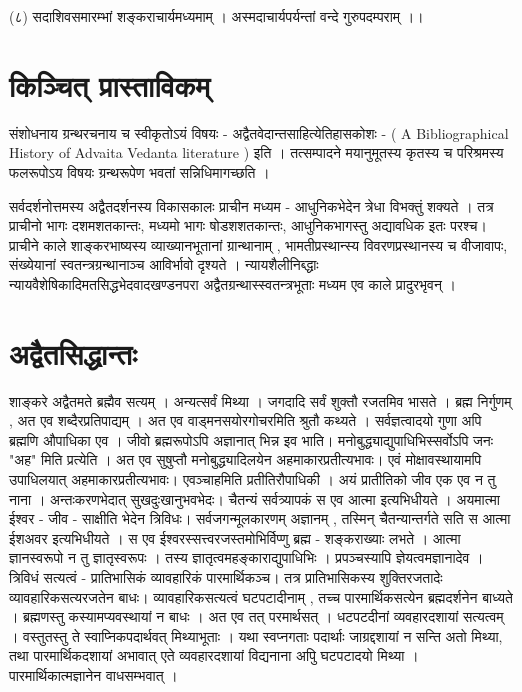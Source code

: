 (८) सदाशिवसमारम्भां शङ्कराचार्यमध्यमाम् ।
अस्मदाचार्यपर्यन्तां वन्दे गुरुपदम्पराम् ।।


\section{किञ्चित् प्रास्ताविकम् }
संशोधनाय ग्रन्थरचनाय च स्वीकृतोऽयं विषयः - अद्वैतवेदान्तसाहित्येतिहासकोशः - ( A Bibliographical History of Advaita Vedanta literature ) इति । तत्सम्पादने मयानुमूतस्य कृतस्य च परिश्रमस्य फलरूपोऽय विषयः ग्रन्थरूपेण भवतां सन्निधिमागच्छति । 

सर्वदर्शनोत्तमस्य अद्वैतदर्शनस्य विकासकालः प्राचीन मध्यम - आधुनिकभेदेन त्रेधा विभक्तुं शक्यते । तत्र प्राचीनो भागः दशमशतकान्तः, मध्यमो भागः षोडशशतकान्तः, आधुनिकभागस्तु अद्यावधिक इतः परश्च। प्राचीने काले शाङ्करभाष्यस्य व्याख्यानभूतानां ग्रान्थानाम् , भामतीप्रस्थान्स्य विवरणप्रस्थानस्य च वीजावापः, संख्येयानां स्वतन्त्रग्रन्थानाञ्च आविर्भावो दृश्यते । न्यायशैलीनिब्द्धाः न्यायवैशेषिकादिमतसिद्धभेदवादखण्डनपरा अद्वैतग्रन्थास्स्वतन्त्रभूताः मध्यम एव काले प्रादुरभृवन् ।

\section{अद्वैतसिद्धान्तः}
शाङ्करे अद्वैतमते ब्रह्मैव सत्यम् । अन्यत्सर्वं मिथ्या । जगदादि सर्वं शुक्तौ रजतमिव भासते । ब्रह्म निर्गुणम् , अत एव शब्दैरप्रतिपाद्यम् । अत एव वाड्मनसयोरगोचरमिति श्रुतौ कथ्यते । सर्वज्ञत्वादयो गुणा अपि ब्रह्मणि औपाधिका एव । जीवो ब्रह्मरूपोऽपि अज्ञानात् भिन्न इव भाति। मनोबुद्ध्याद्युपाधिभिस्सर्वोऽपि जनः "अह" मिति प्रत्येति । अत एव सुषुप्तौ मनोबुद्ध्यादिलयेन अहमाकारप्रतीत्यभावः। एवं मोक्षावस्थायामपि उपाधिलयात् अहमाकारप्रतीत्यभावः। एवञ्चाहमिति प्रतीतिरौपाधिकी । अयं प्रातीतिको जीव एक एव न तु नाना । अन्तःकरणभेदात् सुखदुःखानुभवभेदः। चैतन्यं सर्वत्र्यापकं स एव आत्मा इत्यभिधीयते । अयमात्मा ईश्वर - जीव - साक्षीति भेदेन त्रिविधः। सर्वजगन्मूलकारणम्  अज्ञानम् , तस्मिन् चैतन्यान्तर्गते सति स आत्मा ईशअवर इत्यभिधीयते । स एव ईश्वरस्सत्त्वरजस्तमोभिर्विप्णु ब्रह्म - शङ्कराख्याः लभते । आत्मा ज्ञानस्वरूपो न तु ज्ञातृस्वरूपः । तस्य ज्ञातृत्वमहङ्काराद्युपाधिभिः । प्रपञ्चस्यापि ज्ञेयत्वमज्ञानादेव । त्रिविधं सत्यत्वं - प्रातिभासिकं व्यावहारिकं पारमार्थिकञ्च। तत्र प्रातिभासिकस्य शुक्तिरजतादेः व्यावहारिकसत्यरजतेन बाधः। व्यावहारिकसत्यत्वं घटपटादीनाम् , तच्च पारमार्थिकसत्येन ब्रह्मदर्शनेन बाध्यते । ब्रह्मणस्तु कस्यामप्यवस्थायां न बाधः । अत एव तत् परमार्थसत् । धटपटदीनां व्यवहारदशायां सत्यत्वम् । वस्तुतस्तु ते स्वाप्निकपदार्थवत् मिथ्याभूताः । यथा स्वप्नगताः पदार्थाः जाग्रद्दशायां न सन्ति अतो मिथ्या, तथा पारमार्थिकदशायां अभावात् एते व्यवहारदशायां विद्यनाना अपुि घटपटादयो मिथ्या । पारमार्थिकात्मज्ञानेन वाधसम्भवात् ।


